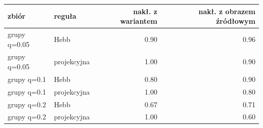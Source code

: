 \begin{tabular}{llrr}
\toprule
zbiór & reguła & nakł. z wariantem & nakł. z obrazem źródłowym \\
\midrule
grupy q=0.05 & Hebb & 0.90 & 0.96 \\
grupy q=0.05 & projekcyjna & 1.00 & 0.90 \\
grupy q=0.1 & Hebb & 0.80 & 0.90 \\
grupy q=0.1 & projekcyjna & 1.00 & 0.80 \\
grupy q=0.2 & Hebb & 0.67 & 0.71 \\
grupy q=0.2 & projekcyjna & 1.00 & 0.60 \\
\bottomrule
\end{tabular}
